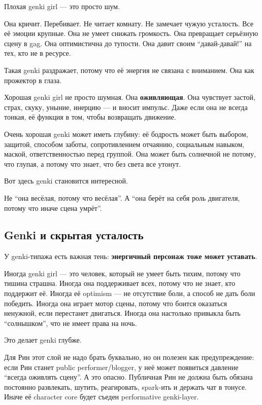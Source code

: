 Плохая genki girl --- это просто шум.

Она кричит. Перебивает. Не читает комнату. Не замечает чужую усталость.
Все её эмоции крупные. Она не умеет снижать громкость. Она превращает
серьёзную сцену в gag. Она оптимистична до тупости. Она давит своим
``давай-давай!'' на тех, кто не в ресурсе.

Такая genki раздражает, потому что её энергия не связана с вниманием.
Она как прожектор в глаза.

Хорошая genki girl не просто шумная. Она \textbf{оживляющая}. Она
чувствует застой, страх, скуку, уныние, инерцию --- и вносит импульс.
Даже если она не всегда тонкая, её функция в том, чтобы возвращать
движение.

Очень хорошая genki может иметь глубину: её бодрость может быть выбором,
защитой, способом заботы, сопротивлением отчаянию, социальным навыком,
маской, ответственностью перед группой. Она может быть солнечной не
потому, что глупая, а потому что знает, что без света все утонут.

Вот здесь genki становится интересной.

Не ``она весёлая, потому что весёлая''. А ``она берёт на себя роль
двигателя, потому что иначе сцена умрёт''.

\subsection*{Genki и скрытая усталость}

У genki-типажа есть важная тень: \textbf{энергичный персонаж тоже может
уставать}.

Иногда genki girl --- это человек, который не умеет быть тихим, потому
что тишина страшна. Иногда она поддерживает всех, потому что не знает,
кто поддержит её. Иногда её optimism --- не отсутствие боли, а способ не
дать боли победить. Иногда она играет мотор сцены, потому что боится
оказаться ненужной, если перестанет двигаться. Иногда она настолько
привыкла быть ``солнышком'', что не имеет права на ночь.

Это делает genki глубже.

Для Рин этот слой не надо брать буквально, но он полезен как
предупреждение: если Рин станет public performer/\hspace{0pt}blogger, у неё может
появиться давление ``всегда оживлять сцену''. А это опасно. Публичная
Рин не должна быть обязана постоянно развлекать, шутить, реагировать,
spark-ить и держать чат в тонусе. Иначе её character core будет съеден
performative genki-layer.


